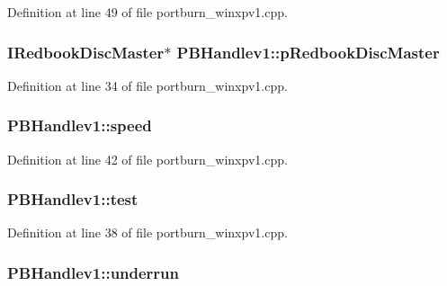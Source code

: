 Definition at line 49 of file portburn\+\_\+winxpv1.\+cpp.

\subsubsection[{\texorpdfstring{p\+Redbook\+Disc\+Master}{pRedbookDiscMaster}}]{\setlength{\rightskip}{0pt plus 5cm}I\+Redbook\+Disc\+Master$\ast$ P\+B\+Handlev1\+::p\+Redbook\+Disc\+Master}\hypertarget{struct_p_b_handlev1_ac00aaf66ca78a71090db85ef7bee7070}{}\label{struct_p_b_handlev1_ac00aaf66ca78a71090db85ef7bee7070}


Definition at line 34 of file portburn\+\_\+winxpv1.\+cpp.

\subsubsection[{\texorpdfstring{speed}{speed}}]{ P\+B\+Handlev1\+::speed}\hypertarget{struct_p_b_handlev1_a3dd77c658bf68f31fe0a95d22767c347}{}\label{struct_p_b_handlev1_a3dd77c658bf68f31fe0a95d22767c347}


Definition at line 42 of file portburn\+\_\+winxpv1.\+cpp.

\subsubsection[{\texorpdfstring{test}{test}}]{ P\+B\+Handlev1\+::test}\hypertarget{struct_p_b_handlev1_a9359934b13e27789d6ffe94678ae92ae}{}\label{struct_p_b_handlev1_a9359934b13e27789d6ffe94678ae92ae}


Definition at line 38 of file portburn\+\_\+winxpv1.\+cpp.

\subsubsection[{\texorpdfstring{underrun}{underrun}}]{ P\+B\+Handlev1\+::underrun}\hypertarget{struct_p_b_handlev1_ab0f960395689a7f26aea98a899b32b7f}{}\label{struct_p_b_handlev1_ab0f960395689a7f26aea98a899b32b7f}


